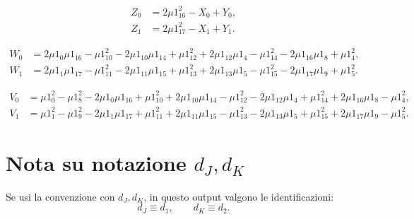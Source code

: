 \documentclass[11pt,a4paper]{article}
\begin{document}
\begin{align}
Z_0 &= 2\mu1_{16}^2 - X_0 + Y_0,\\
Z_1 &= 2\mu1_{17}^2 - X_1 + Y_1.
\end{align}

\begin{align}
W_0 &= 2\mu1_0\mu1_{16}-\mu1_{10}^2-2\mu1_{10}\mu1_{14}+\mu1_{12}^2+2\mu1_{12}\mu1_4-\mu1_{14}^2-2\mu1_{16}\mu1_8+\mu1_4^2,\\
W_1 &= 2\mu1_1\mu1_{17}-\mu1_{11}^2-2\mu1_{11}\mu1_{15}+\mu1_{13}^2+2\mu1_{13}\mu1_5-\mu1_{15}^2-2\mu1_{17}\mu1_9+\mu1_5^2.
\end{align}

\begin{align}
V_0 &= \mu1_0^2-\mu1_8^2-2\mu1_0\mu1_{16}+\mu1_{10}^2+2\mu1_{10}\mu1_{14}-\mu1_{12}^2-2\mu1_{12}\mu1_4+\mu1_{14}^2+2\mu1_{16}\mu1_8-\mu1_4^2,\\
V_1 &= \mu1_1^2-\mu1_9^2-2\mu1_1\mu1_{17}+\mu1_{11}^2+2\mu1_{11}\mu1_{15}-\mu1_{13}^2-2\mu1_{13}\mu1_5+\mu1_{15}^2+2\mu1_{17}\mu1_9-\mu1_5^2.
\end{align}

\section*{Nota su notazione $d_J,d_K$}
Se usi la convenzione con \(d_J,d_K\), in questo output valgono le identificazioni:
\begin{equation}
d_J \equiv d_1, \qquad d_K \equiv d_2.
\end{equation}
\end{document}
